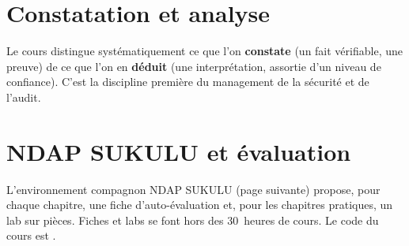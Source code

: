 \section*{Constatation et analyse}

Le cours distingue systématiquement ce que l'on \textbf{constate} (un fait
vérifiable, une preuve) de ce que l'on en \textbf{déduit} (une interprétation,
assortie d'un niveau de confiance). C'est la discipline première du management
de la sécurité et de l'audit.

\section*{NDAP SUKULU et évaluation}

L'environnement compagnon NDAP SUKULU (page suivante) propose, pour chaque
chapitre, une fiche d'auto-évaluation et, pour les chapitres pratiques, un
lab sur pièces. Fiches et labs se font hors des 30~heures de cours. Le code
du cours est \textbf{\codeUE}.
